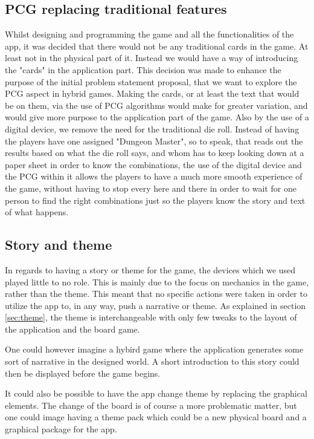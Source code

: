 \subsection{PCG replacing traditional features}
Whilst designing and programming the game and all the functionalities of the app, it was decided that there would not be any traditional cards in the game. At least not in the physical part of it. Instead we would have a way of introducing the "cards" in the application part. This decision was made to enhance the purpose of the initial problem statement proposal, that we want to explore the PCG aspect in hybrid games. Making the cards, or at least the text that would be on them, via the use of PCG algorithms would make for greater variation, and would give more purpose to the application part of the game. Also by the use of a digital device, we remove the need for the traditional die roll. Instead of having the players have one assigned "Dungeon Master", so to speak, that reads out the results based on what the die roll says, and whom has to keep looking down at a paper sheet in order to know the combinations, the use of the digital device and the PCG within it allows the players to have a much more smooth experience of the game, without having to stop every here and there in order to wait for one person to find the right combinations just so the players know the story and text of what happens.

\subsection{Story and theme}
In regards to having a story or theme for the game, the devices which we used played little to no role. 
This is mainly due to the focus on mechanics in the game, rather than the theme. This meant that no specific actions were taken in order to utilize the app to, in any way, push a narrative or theme.
As explained in section \ref{sec:theme}, the theme is interchangeable with only few tweaks to the layout of the application and the board game. 

One could however imagine a hybird game where the application generates some sort of narrative in the designed world. A short introduction to this story could then be displayed before the game begins. 

It could also be possible to have the app change theme by replacing the graphical elements. The change of the board is of course a more problematic matter, but one could image having a theme pack which could be a new physical board and a graphical package for the app.

